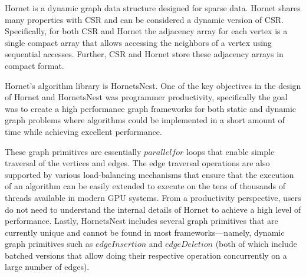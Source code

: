 Hornet \cite{green-hornet,hornet-repo} is a dynamic graph data structure designed for sparse data. Hornet shares many properties with CSR and can be considered a dynamic version of CSR. Specifically, for both CSR and Hornet the adjacency array for each vertex is a single compact array that allows accessing the neighbors of a vertex using sequential accesses. Further, CSR and Hornet store these adjacency arrays in compact format. %


Hornet's algorithm library is HornetsNest. One of the key objectives in the design of Hornet and HornetsNest was programmer productivity, specifically the goal was to create a high performance graph frameworks for both static and dynamic graph problems where algorithms could be implemented in a short amount of time while achieving excellent performance. %

These graph primitives are essentially $parallel for$ loops that enable simple traversal of the vertices and edges. The edge traversal operations are also supported by various load-balancing mechanisms that ensure that the execution of an algorithm can be easily extended to execute on the tens of thousands of threads available in modern GPU systems. From a productivity perspective, users do not need to understand the internal details of Hornet to achieve a high level of performance. %
Lastly, HornetsNest includes several graph primitives that are currently unique and cannot be found in most frameworks---namely, dynamic graph primitives such as $edgeInsertion$ and $edgeDeletion$ (both of which include batched versions that allow doing their respective operation concurrently on a large number of edges).

